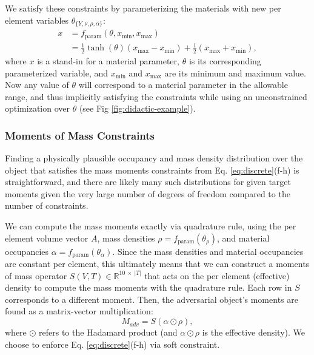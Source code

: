 We satisfy these constraints by parameterizing the materials with new per element variables $\theta_{\{Y, \nu, \rho, \alpha\}}$:
\begin{equation}
\label{eq:parameterization}
\begin{split}
	x &= f_\text{param}(\theta, x_\text{min}, x_\text{max}) \\ &= \frac{1}{2} \tanh\left(\theta \right)(x_\text{max} - x_\text{min}) +  \frac{1}{2}(x_\text{max} + x_\text{min}),
\end{split}
\end{equation}
where $x$ is a stand-in for a material parameter, $\theta$ is its corresponding parameterized variable, and $x_\text{min}$ and $x_\text{max}$ are its minimum and maximum value. 
Now any value of $\theta$ will correspond to a material parameter in the allowable range, and thus implicitly satisfying the constraints while using an unconstrained optimization over $\theta$ (see Fig \ref{fig:didactic-example}). 

\subsubsection{Moments of Mass Constraints}
Finding a physically plausible occupancy and mass density distribution over the object that satisfies the mass moments constraints from Eq. \ref{eq:discrete}(f-h) is straightforward, and there are likely many such distributions for given target moments given the very large number of degrees of freedom compared to the number of constraints. 

We can compute the mass moments exactly via quadrature rule, using the per element volume vector $A$, mass densities $\rho = f_\text{param}(\theta_\rho)$, and material occupancies $\alpha = f_\text{param}(\theta_\alpha)$.  Since the mass densities and material occupancies are constant per element, this ultimately means that we can construct a moments of mass operator $S(V, T) \in \mathbb{R}^{10\ \times\ |T|}$  that acts on the per element (effective) density to compute the mass moments with the quadrature rule. Each row in $S$ corresponds to a different moment. Then, the adversarial object's moments are found as a matrix-vector multiplication:
\begin{equation}
\label{eq:moment-construction}
	M_{adv} = S (\alpha \odot \rho),
\end{equation}
where $\odot$ refers to the Hadamard product (and $\alpha \odot \rho$ is the effective density). %
We choose to enforce Eq. \ref{eq:discrete}(f-h) via soft constraint.

